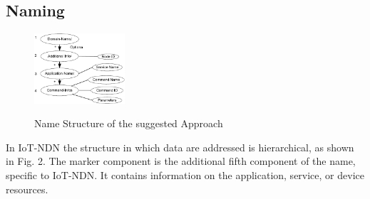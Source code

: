 \documentclass[conference]{IEEEtran}
\begin{document}


\subsection{Naming}
\begin{figure}[h]
    \centering
    \includegraphics[width=0.3\textwidth]{Name_Structure_of_the_suggested_Approach.png}\\
    \caption{Name Structure of the suggested Approach}
    \label{fig:enter-label}
\end{figure}

In IoT-NDN the structure in which data are addressed is hierarchical, as shown in Fig. 2.
The marker component is the additional fifth component of the name, specific to IoT-NDN.
It contains information on the application, service, or device resources.
\end{document}
